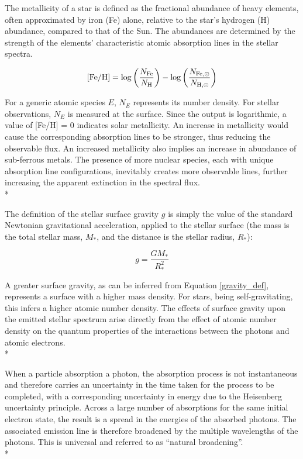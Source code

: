 \documentclass[12pt, a4paper]{report}
\begin{document}
The metallicity of a star is defined as the fractional abundance of heavy elements, often approximated by iron (Fe) alone, relative to the star's hydrogen (H) abundance, compared to that of the Sun. The abundances are determined by the strength of the elements' characteristic atomic absorption lines in the stellar spectra.

\begin{equation}
\textnormal{[Fe/H]} = \log\left(\frac{N_{\textnormal{Fe}}}{N_{\textnormal{H}}}\right) - \log\left(\frac{N_{\textnormal{Fe},\odot}}{N_{\textnormal{H},\odot}}\right)
\label{FeH_def}
\end{equation}

For a generic atomic species $E$, $N_{E}$ represents its number density. For stellar observations, $N_{E}$ is measured at the surface. Since the output is logarithmic, a value of [Fe/H] = 0 indicates solar metallicity. An increase in metallicity would cause the corresponding absorption lines to be stronger, thus reducing the observable flux. An increased metallicity also implies an increase in abundance of sub-ferrous metals. The presence of more nuclear species, each with unique absorption line configurations, inevitably creates more observable lines, further increasing the apparent extinction in the spectral flux.\\*

The definition of the stellar surface gravity $g$ is simply the value of the standard Newtonian gravitational acceleration, applied to the stellar surface (the mass is the total stellar mass, $M_{*}$, and the distance is the stellar radius, $R_{*}$):

\begin{equation}
g = \frac{GM_{*}}{R_{*}^{2}}
\label{gravity_def}
\end{equation}

A greater surface gravity, as can be inferred from Equation \ref{gravity_def}, represents a surface with a higher mass density. For stars, being self-gravitating, this infers a higher atomic number density. The effects of surface gravity upon the emitted stellar spectrum arise directly from the effect of atomic number density on the quantum properties of the interactions between the photons and atomic electrons. \\*

When a particle absorption a photon, the absorption process is not instantaneous and therefore carries an uncertainty in the time taken for the process to be completed, with a corresponding uncertainty in energy due to the Heisenberg uncertainty principle. Across a large number of absorptions for the same initial electron state, the result is a spread in the energies of the absorbed photons. The associated emission line is therefore broadened by the multiple wavelengths of the photons. This is universal and referred to as ``natural broadening''.\\*
\end{document}
